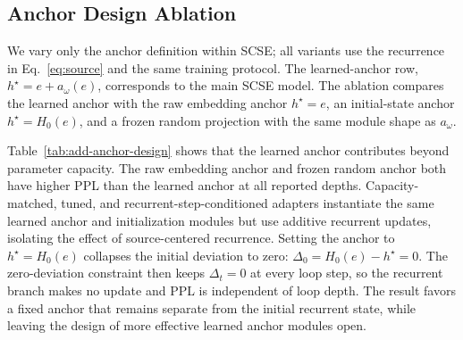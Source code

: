 \documentclass[letterpaper]{article} %
\newcommand{\SCSE}{\textsc{SCSE}}
\theoremstyle{remark}
\begin{document}
\subsection{Anchor Design Ablation}
\label{sec:anchor-design-ablation}

We vary only the anchor definition within \SCSE{}; all variants use the recurrence in Eq.~\ref{eq:source} and the same training protocol.  The learned-anchor row, $h^\star=e+a_\omega(e)$, corresponds to the main \SCSE{} model.  The ablation compares the learned anchor with the raw embedding anchor $h^\star=e$, an initial-state anchor $h^\star=H_0(e)$, and a frozen random projection with the same module shape as $a_\omega$.

\begin{table}[t!]
	\centering
	\scriptsize
	\caption{Anchor design ablation on WikiText-103.  The learned anchor has the lowest PPL among the tested source-centered anchors.  Setting the anchor equal to the initial state collapses the initial deviation to zero and prevents useful recurrent motion under the zero-deviation constraint, yielding the flat depth curve.}
	\label{tab:add-anchor-design}
\end{table}

Table~\ref{tab:add-anchor-design} shows that the learned anchor contributes beyond parameter capacity.  The raw embedding anchor and frozen random anchor both have higher PPL than the learned anchor at all reported depths.  Capacity-matched, tuned, and recurrent-step-conditioned adapters instantiate the same learned anchor and initialization modules but use additive recurrent updates, isolating the effect of source-centered recurrence.  Setting the anchor to $h^\star=H_0(e)$ collapses the initial deviation to zero: $\Delta_0=H_0(e)-h^\star=0$.  The zero-deviation constraint then keeps $\Delta_t=0$ at every loop step, so the recurrent branch makes no update and PPL is independent of loop depth.  The result favors a fixed anchor that remains separate from the initial recurrent state, while leaving the design of more effective learned anchor modules open.
\end{document}
